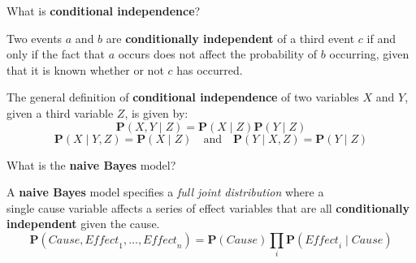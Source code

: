 \begin{flashcard}[Question]{What is \textbf{conditional independence}?}
\begin{center}

Two events $a$ and $b$ are \textbf{conditionally independent} of a third event $c$ if and only if the fact that $a$ occurs does not affect the probability of $b$ occurring, given that it is known whether or not $c$ has occurred.

\medskip

The general definition of \textbf{conditional independence} of two variables $X$ and $Y$, given a third variable $Z$, is given by:
\begin{displaymath}
\mathbf{P}(X, Y \mid Z) = \mathbf{P}(X \mid Z) \mathbf{P}(Y \mid Z)
\end{displaymath}
\begin{displaymath}
\mathbf{P}(X \mid Y, Z) = \mathbf{P}(X \mid Z) \quad \text{and} \quad \mathbf{P}(Y \mid X, Z) = \mathbf{P}(Y \mid Z)
\end{displaymath}

\end{center}
\end{flashcard}

\begin{flashcard}[Question]{What is the \textbf{naive Bayes} model?}
\begin{center}

A \textbf{naive Bayes} model specifies a \textit{full joint distribution} where a\\single cause variable affects a series of effect variables that are all \textbf{conditionally independent} given the cause.
\begin{displaymath}
\mathbf{P}(\textit{Cause}, \textit{Effect}_1, \ldots, \textit{Effect}_n) = \mathbf{P}(\textit{Cause}) \prod_i \mathbf{P}(\textit{Effect}_i \mid \textit{Cause})
\end{displaymath}

\end{center}
\end{flashcard}
